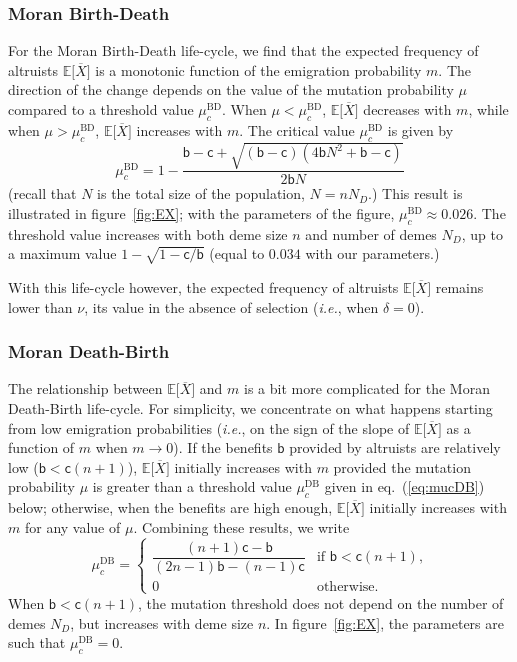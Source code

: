 \documentclass[11pt, letterpaper]{article}
\renewcommand{\eqref}[1]{\textup{{\normalfont eq.~(\ref{#1}}\normalfont)}}
\newcommand{\ie}{\textit{i.e.}}
\newcommand{\Esp}[1]{\mathbb{E}\big[ #1\big]}%
\newcommand{\bb}{\mathsf{b}}
\newcommand{\cc}{\mathsf{c}}
\newcommand{\BD}{\textrm{BD}}
\newcommand{\DB}{\textrm{DB}}
\newcommand{\mutbias}{\nu}
\newcommand{\ndemes}{N_D}
\newcommand{\selstr}{\delta}
\begin{document}
\subsubsection*{Moran Birth-Death}

For the Moran Birth-Death life-cycle, we find that the expected frequency of altruists $\Esp{\overline{X}}$ is a monotonic function of the emigration probability $m$. The direction of the change depends on the value of the mutation probability $\mu$ compared to a threshold value $\mu_c^{\BD}$. When $\mu<\mu_c^{\BD}$, $\Esp{\overline{X}}$ decreases with $m$, while when $\mu>\mu_c^{\BD}$, $\Esp{\overline{X}}$  increases with $m$. The critical value $\mu_c^{\BD}$ is given by 
\begin{equation}\label{eq:mucBD}
\mu_c^{\BD} = %
1 - \frac{\bb  - \cc + \sqrt{(\bb - \cc) \left(4 \bb N^2 + \bb - \cc \right)} }{2 \bb N}
\end{equation}
%
(recall that $N$ is the total size of the population, $N=n \ndemes$.) This result is illustrated in figure~\ref{fig:EX}; with the parameters of the figure, $\mu_c^{\BD} \approx 0.026$. The threshold value increases with both deme size $n$ and number of demes $\ndemes$, up to a maximum value $1 - \sqrt{1-\cc/\bb}$ (equal to $0.034$ with our parameters.)

With this life-cycle however, the expected frequency of altruists $\Esp{\overline{X}}$ remains lower than $\mutbias$, its value in the absence of selection (\ie, when $\selstr =0$). 

\subsubsection*{Moran Death-Birth}

The relationship between $\Esp{\overline{X}}$ and $m$ is a bit more complicated for the Moran Death-Birth life-cycle. For simplicity, we concentrate on what happens starting from low emigration probabilities (\ie, on the sign of the slope of $\Esp{\overline{X}}$ as a function of $m$ when $m\to 0$). If the benefits $\bb$ provided by altruists are relatively low ($\bb < \cc (n+1)$), $\Esp{\overline{X}}$ initially increases with $m$ provided the mutation probability $\mu$ is greater than a threshold value $\mu_c^{\DB}$ given in \eqref{eq:mucDB} below; otherwise, when the benefits are high enough, $\Esp{\overline{X}}$ initially increases with $m$ for any value of $\mu$. Combining these results, we write
\begin{equation}\label{eq:mucDB}
\mu_c^{\DB} = \begin{cases}
\dfrac{ (n+1) \cc - \bb}{ (2 n - 1) \bb - (n-1) \cc} & \textrm{if $\bb < \cc (n+1)$,} \\
%
0 & \textrm{otherwise. }
\end{cases}
\end{equation} 
%
When $\bb < \cc (n+1)$, the mutation threshold does not depend on the number of demes $\ndemes$, but increases with deme size $n$. In figure~\ref{fig:EX}, the parameters are such that $\mu_c^{\DB} = 0$. 
\end{document}
